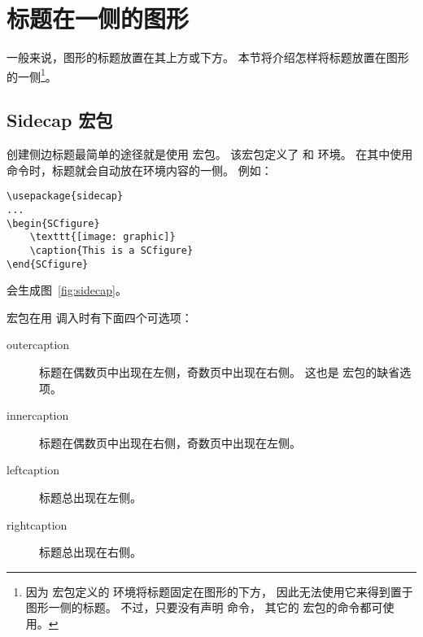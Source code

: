 \begin{figure}
	\centering
	\begin{minipage}[c]{1in}
		\hfill
	\end{minipage}%
	\hspace{0.2in}%
	\begin{minipage}[c]{0.5in}
		\captionsetup{width=2in}
		\label{fig:rotcaption}
	\end{minipage}
\end{figure}


\section{标题在一侧的图形}\label{sec:sidecaption}

一般来说，图形的标题放置在其上方或下方。
本节将介绍怎样将标题放置在图形的一侧\footnote{
	因为  宏包定义的  环境将标题固定在图形的下方，
	因此无法使用它来得到置于图形一侧的标题。
	不过，只要没有声明  命令，
	其它的  宏包的命令都可使用。}。


\subsection{Sidecap 宏包}\label{ssec:sidecap}

创建侧边标题最简单的途径就是使用  宏包。
该宏包定义了  和  环境。
在其中使用  命令时，标题就会自动放在环境内容的一侧。
例如：
\begin{lstlisting}
\usepackage{sidecap}
...
\begin{SCfigure}
	\texttt{[image: graphic]}
	\caption{This is a SCfigure}
\end{SCfigure}
\end{lstlisting}
会生成图~\ref{fig:sidecap}。

\begin{SCfigure} 
	\resizebox{3in}{!}{\usebox{\boxgraphic}}
	\caption{This is a SCfigure}
	\label{fig:sidecap}
\end{SCfigure}

 宏包在用  调入时有下面四个可选项：
\begin{description}
	\item [outercaption] 标题在偶数页中出现在左侧，奇数页中出现在右侧。
	这也是  宏包的缺省选项。
	\item [innercaption] 标题在偶数页中出现在右侧，奇数页中出现在左侧。
	\item [leftcaption]  标题总出现在左侧。
	\item [rightcaption] 标题总出现在右侧。
\end{description}

